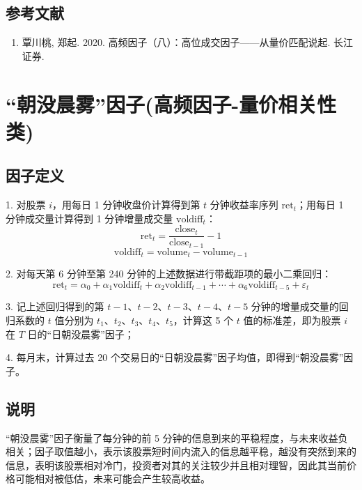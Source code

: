 \documentclass{article}
\begin{document}
\subsection{参考文献}
\begin{enumerate}
    \item 覃川桃, 郑起. 2020. 高频因子（八）：高位成交因子——从量价匹配说起. 长江证券.
\end{enumerate}

\section{“朝没晨雾”因子(高频因子-量价相关性类)}

\subsection{因子定义}

1. 对股票 \( i \)，用每日 1 分钟收盘价计算得到第 \( t \) 分钟收益率序列 \( \mathrm{ret}_t \)；用每日 1 分钟成交量计算得到 1 分钟增量成交量 \( \mathrm{voldiff}_t \)：
   \begin{equation}
       \mathrm{ret}_t = \frac{\mathrm{close}_t}{\mathrm{close}_{t-1}} - 1
   \end{equation}
   \begin{equation}
       \mathrm{voldiff}_t = \mathrm{volume}_t - \mathrm{volume}_{t-1}
   \end{equation}

2. 对每天第 6 分钟至第 240 分钟的上述数据进行带截距项的最小二乘回归：
   \begin{equation}
       \mathrm{ret}_t = \alpha_0 + \alpha_1 \mathrm{voldiff}_t + \alpha_2 \mathrm{voldiff}_{t-1} + \cdots + \alpha_6 \mathrm{voldiff}_{t-5} + \varepsilon_t
   \end{equation}

3. 记上述回归得到的第 \( t-1 \)、\( t-2 \)、\( t-3 \)、\( t-4 \)、\( t-5 \) 分钟的增量成交量的回归系数的 \( t \) 值分别为 \( t_1 \)、\( t_2 \)、\( t_3 \)、\( t_4 \)、\( t_5 \)，计算这 5 个 \( t \) 值的标准差，即为股票 \( i \) 在 \( T \) 日的“日朝没晨雾”因子；

4. 每月末，计算过去 20 个交易日的“日朝没晨雾”因子均值，即得到“朝没晨雾”因子。

\subsection{说明}
“朝没晨雾”因子衡量了每分钟的前 5 分钟的信息到来的平稳程度，与未来收益负相关；因子取值越小，表示该股票短时间内流入的信息越平稳，越没有突然到来的信息，表明该股票相对冷门，投资者对其的关注较少并且相对理智，因此其当前价格可能相对被低估，未来可能会产生较高收益。
\end{document}

